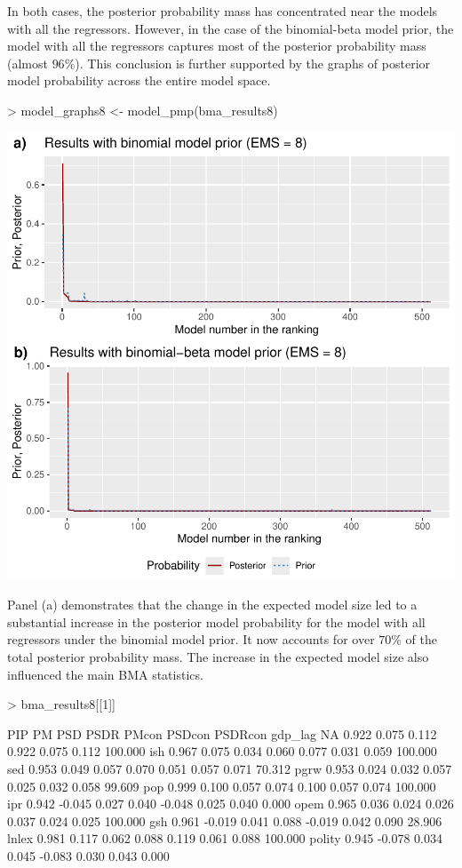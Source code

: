 \documentclass[a4paper]{article}
\begin{document}
In both cases, the posterior probability mass has concentrated near the models with all the regressors.
However, in the case of the binomial-beta model prior, the model with all the regressors captures most of the posterior probability mass (almost $96\%$).
This conclusion is further supported by the graphs of posterior model probability across the entire model space.
\begin{Schunk}
\begin{Sinput}
> model_graphs8 <- model_pmp(bma_results8)
\end{Sinput}
\end{Schunk}
\includegraphics{bdsm_vignette-035}

Panel (a) demonstrates that the change in the expected model size led to a substantial increase in the posterior model probability for the model with all regressors under the binomial model prior.
It now accounts for over $70\%$ of the total posterior probability mass.
The increase in the expected model size also influenced the main BMA statistics.
\begin{Schunk}
\begin{Sinput}
> bma_results8[[1]]
\end{Sinput}
\begin{Soutput}
          PIP     PM   PSD  PSDR  PMcon PSDcon PSDRcon    %
gdp_lag    NA  0.922 0.075 0.112  0.922  0.075   0.112 100.000
ish     0.967  0.075 0.034 0.060  0.077  0.031   0.059 100.000
sed     0.953  0.049 0.057 0.070  0.051  0.057   0.071  70.312
pgrw    0.953  0.024 0.032 0.057  0.025  0.032   0.058  99.609
pop     0.999  0.100 0.057 0.074  0.100  0.057   0.074 100.000
ipr     0.942 -0.045 0.027 0.040 -0.048  0.025   0.040   0.000
opem    0.965  0.036 0.024 0.026  0.037  0.024   0.025 100.000
gsh     0.961 -0.019 0.041 0.088 -0.019  0.042   0.090  28.906
lnlex   0.981  0.117 0.062 0.088  0.119  0.061   0.088 100.000
polity  0.945 -0.078 0.034 0.045 -0.083  0.030   0.043   0.000
\end{Soutput}
\end{Schunk}
\end{document}
